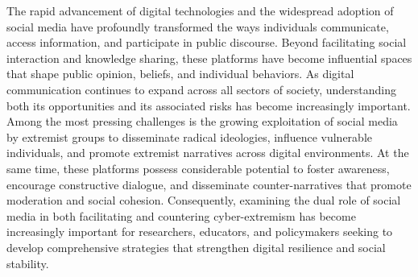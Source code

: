 \documentclass{NSP1}
\begin{document}
\vspace{3mm}

\vspace{1mm}
\noindent{\color{rulecolor}\rule{\textwidth}{1pt}}
\vspace{3mm}


\par\vspace{6.0pt}\vspace{12.0pt}

The rapid advancement of digital technologies and the widespread adoption of social media have profoundly transformed the ways individuals communicate, access information, and participate in public discourse. Beyond facilitating social interaction and knowledge sharing, these platforms have become influential spaces that shape public opinion, beliefs, and individual behaviors. As digital communication continues to expand across all sectors of society, understanding both its opportunities and its associated risks has become increasingly important. Among the most pressing challenges is the growing exploitation of social media by extremist groups to disseminate radical ideologies, influence vulnerable individuals, and promote extremist narratives across digital environments. At the same time, these platforms possess considerable potential to foster awareness, encourage constructive dialogue, and disseminate counter-narratives that promote moderation and social cohesion. Consequently, examining the dual role of social media in both facilitating and countering cyber-extremism has become increasingly important for researchers, educators, and policymakers seeking to develop comprehensive strategies that strengthen digital resilience and social stability.
\end{document}
